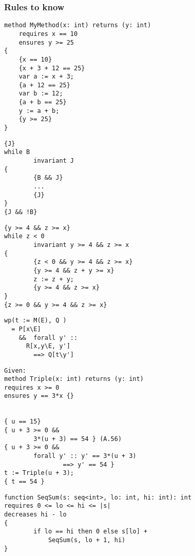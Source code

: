 \subsubsection{Rules to know}

\begin{verbatim}
method MyMethod(x: int) returns (y: int)
    requires x == 10
    ensures y >= 25
{
    {x == 10}
    {x + 3 + 12 == 25}
    var a := x + 3;
    {a + 12 == 25}
    var b := 12;
    {a + b == 25}
    y := a + b;
    {y >= 25}
}

\end{verbatim}


\begin{verbatim}
{J}
while B
        invariant J
{
        {B && J}
        ... 
        {J}
}
{J && !B}
\end{verbatim}

\begin{verbatim}
{y >= 4 && z >= x}
while z < 0
        invariant y >= 4 && z >= x
{
        {z < 0 && y >= 4 && z >= x}
        {y >= 4 && z + y >= x}
        z := z + y;
        {y >= 4 && z >= x}
}
{z >= 0 && y >= 4 && z >= x}
\end{verbatim}

\begin{verbatim}
wp(t := M(E), Q )
  = P[x\E]
    &&  forall y' ::
      R[x,y\E, y'] 
        ==> Q[t\y']
\end{verbatim}
\begin{verbatim}
Given:
method Triple(x: int) returns (y: int)
requires x >= 0
ensures y == 3*x {}


{ u == 15}
{ u + 3 >= 0 &&
        3*(u + 3) == 54 } (A.56)
{ u + 3 >= 0 &&
        forall y' :: y' == 3*(u + 3)
                ==> y' == 54 }
t := Triple(u + 3);
{ t == 54 }

\end{verbatim}
\begin{verbatim}
function SeqSum(s: seq<int>, lo: int, hi: int): int
requires 0 <= lo <= hi <= |s|
decreases hi - lo
{
        if lo == hi then 0 else s[lo] +
            SeqSum(s, lo + 1, hi)
}
\end{verbatim}